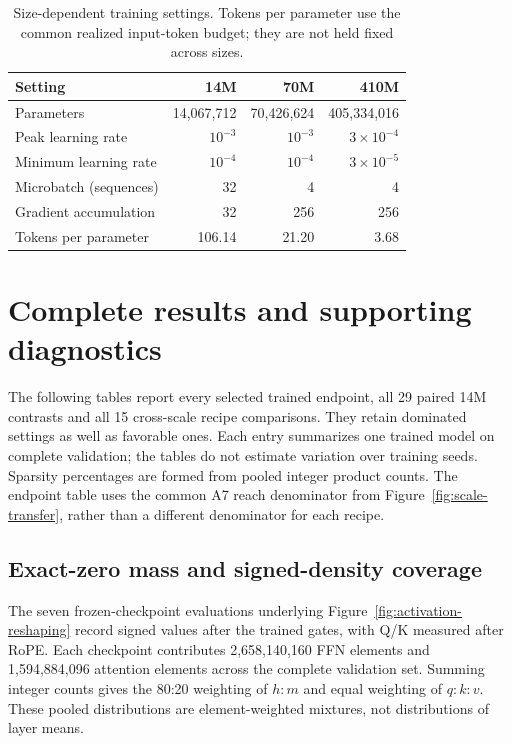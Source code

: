 \begin{table}[htbp]
\centering\small
\caption{Size-dependent training settings. Tokens per parameter use the
common realized input-token budget; they are not held fixed across sizes.}
\label{tab:training-settings}
\begin{tabular}{@{}lrrr@{}}
\toprule
Setting & 14M & 70M & 410M \\
\midrule
Parameters & 14,067,712 & 70,426,624 & 405,334,016 \\
Peak learning rate & $10^{-3}$ & $10^{-3}$ & $3\!\times\!10^{-4}$ \\
Minimum learning rate & $10^{-4}$ & $10^{-4}$ & $3\!\times\!10^{-5}$ \\
Microbatch (sequences) & 32 & 4 & 4 \\
Gradient accumulation & 32 & 256 & 256 \\
Tokens per parameter & 106.14 & 21.20 & 3.68 \\
\bottomrule
\end{tabular}
\end{table}

\FloatBarrier
\section{Complete results and supporting diagnostics}
\label{app:complete-results}

The following tables report every selected trained endpoint, all 29 paired
14M contrasts and all 15 cross-scale recipe comparisons. They retain
dominated settings as well as favorable ones. Each entry summarizes one
trained model on complete validation; the tables do not estimate variation
over training seeds. Sparsity percentages are formed from pooled integer
product counts. The endpoint table uses the common A7 reach denominator
from Figure~\ref{fig:scale-transfer}, rather than a different denominator
for each recipe.





\subsection{Exact-zero mass and signed-density coverage}
\label{app:density-results}

The seven frozen-checkpoint evaluations underlying
Figure~\ref{fig:activation-reshaping} record signed values after the trained
gates, with Q/K measured after RoPE. Each checkpoint contributes
2,658,140,160 FFN elements and 1,594,884,096 attention elements across the
complete validation set. Summing integer counts gives the 80:20 weighting
of $h:m$ and equal weighting of $q:k:v$. These pooled distributions are
element-weighted mixtures, not distributions of layer means.

